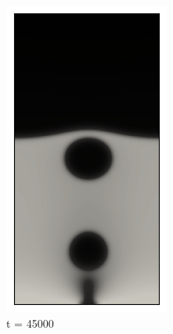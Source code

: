 \begin{figure}[h!]
\begin{subfigure}{0.25\textwidth}
		\includegraphics[width=\linewidth]{figs/cap4/bubble_45}
		\caption{t = 45000}
		\label{fig:8}
	\end{subfigure}\hfil %
	\begin{subfigure}{0.25\textwidth}

\end{subfigure}
\end{figure}
